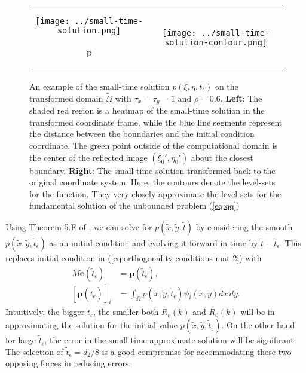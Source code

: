 \begin{figure}
  \centering
  \begin{tabular}{cc}
    \begin{minipage}{0.5\textwidth}
      \centering
      \texttt{[image: ../small-time-solution.png]}
    \end{minipage}p
    & \begin{minipage}{0.5\textwidth}
      \centering
      \texttt{[image: ../small-time-solution-contour.png]}
    \end{minipage}
  \end{tabular}
  \caption{An example of the small-time solution
    $p(\xi,\eta,t_\epsilon)$ on the transformed domain
    $\tilde{\Omega}$ with $\tau_x = \tau_y = 1$ and
    $\rho=0.6$. \textbf{Left}: The shaded red region is a heatmap of
    the small-time solution in the transformed coordinate frame, while
    the blue line segments represent the distance between the
    boundaries and the initial condition coordinate. The green point
    outside of the computational domain is the center of the reflected
    image $(\xi_0', \eta_0')$ about the closest
    boundary. \textbf{Right}: The small-time solution transformed back
    to the original coordinate system. Here, the contours denote the
    level-sets for the function. They very closely approximate the
    level sets for the fundamental solution of the unbounded problem
    (\ref{eq:qq})}
  \label{fig:step-1-small-time}
\end{figure}
Using Theorem 5.E of \cite{zeidler1995applied}, we can solve for
$p(\tilde{x},\tilde{y},\tilde{t})$ by considering the smooth
$p(\tilde{x},\tilde{y},\tilde{t}_\epsilon)$ as an initial condition
and evolving it forward in time by $\tilde{t} -
\tilde{t}_\epsilon$. This replaces initial condition in
(\ref{eq:orthogonality-conditions-mat-2}) with
\begin{align}
  M \mathbf{c}(\tilde{t}_\epsilon) &= \mathbf{p}(\tilde{t}_\epsilon), \\
  [\mathbf{p}(\tilde{t}_\epsilon)]_i &= \displaystyle \int_{\tilde{\Omega}} p(\tilde{x},\tilde{y},\tilde{t}_\epsilon) \psi_i(\tilde{x},\tilde{y}) d\tilde{x}\,d\tilde{y}. \nonumber
\end{align}
Intuitively, the bigger $\tilde{t}_\epsilon$, the smaller both
$R_e(k)$ and $R_0(k)$ will be in approximating the solution for the
initial value $p(\tilde{x},\tilde{y},\tilde{t}_\epsilon)$. On the
other hand, for large $\tilde{t}_\epsilon$, the error in the
small-time approximate solution will be significant. The selection of
$\tilde{t}_\epsilon = d_2/8$ is a good compromise for accommodating
these two opposing forces in reducing errors.




